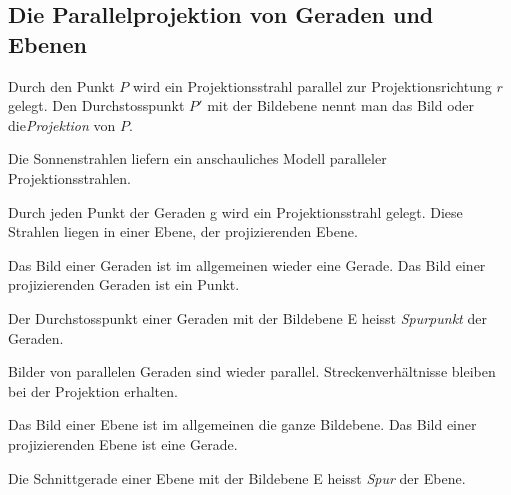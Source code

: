 \documentclass[%
11pt,%
twoside,%
titlepage,%
german,%
headsepline%
]{scrartcl}
\begin{document}
\subsection{Die Parallelprojektion von Geraden und Ebenen}
\begin{cdef}[Projektion]{}
Durch den Punkt $P$ wird ein Projektionsstrahl parallel zur Projektionsrichtung $r$ gelegt. Den Durchstosspunkt $P'$ mit der Bildebene nennt man das Bild oder die\emph{Projektion} von $P$.
\end{cdef}
\begin{center}
\end{center}

\begin{bem}
Die Sonnenstrahlen liefern ein anschauliches Modell paralleler Projektionsstrahlen.
\end{bem}

Durch jeden Punkt der Geraden g wird ein Projektionsstrahl gelegt. Diese Strahlen liegen in einer Ebene, der projizierenden Ebene.

Das Bild einer Geraden ist im allgemeinen wieder eine Gerade. Das Bild einer projizierenden Geraden ist ein Punkt.
\begin{cdef}[Spurpunkt]{}
Der Durchstosspunkt einer Geraden mit der Bildebene E heisst \emph{Spurpunkt} der Geraden.
\end{cdef}
Bilder von parallelen Geraden sind wieder parallel. Streckenverh\"altnisse bleiben bei der Projektion erhalten.

Das Bild einer Ebene ist im allgemeinen die ganze Bildebene. Das Bild einer projizierenden Ebene ist eine Gerade.
\begin{cdef}[Spur]{}
Die Schnittgerade einer Ebene mit der Bildebene E heisst \emph{Spur} der Ebene.
\end{cdef}
\end{document}
